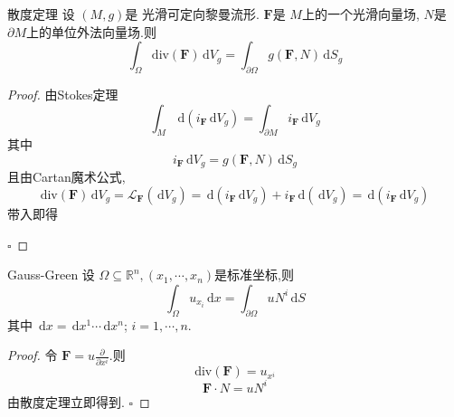 \documentclass[../../main.tex]{subfiles}
\begin{document}
\begin{theorem}{散度定理}
    设 \(  \left( M,g \right)   \)是 光滑可定向黎曼流形. \(  \mathbf{F}  \)是 \(  M  \)上的一个光滑向量场, \(  N  \)是 \(   \partial M  \)上的单位外法向量场.则 \[
    \int_{ \Omega } \mathrm{div}\left(  \mathbf{F} \right) \,\mathrm{d} V_{g}=  \int_{ \partial  \Omega }g\left( \mathbf{F},N \right)\,\mathrm{d} S_{g}  
    \]    
\end{theorem}

\begin{proof}
    由Stokes定理 \[
    \int_{M}\,\mathrm{d} \left( i _{\mathbf{F}}\,\mathrm{d} V _{g}\right)= \int_{ \partial M} i_{\mathbf{F}}\,\mathrm{d} V_{g} 
    \]其中 \[
    i_{\mathbf{F}}\,\mathrm{d} V_{g}= g\left( \mathbf{F},N \right)\,\mathrm{d} S_{g} 
    \]且由Cartan魔术公式, \[
     \mathrm{div}\left( \mathbf{F} \right)\,\mathrm{d} V_{g}= \mathcal{L}_{\mathbf{F}}\left( \,\mathrm{d} V _{g}\right) = \,\mathrm{d} \left( i_{\mathbf{F}}\,\mathrm{d} V_{g} \right)+ i_{\mathbf{F}}\,\mathrm{d} \left( \,\mathrm{d} V_{g} \right)= \,\mathrm{d} \left( i_{\mathbf{F}}\,\mathrm{d} V_{g} \right)   
    \]带入即得

    \hfill $\square$
\end{proof}
\begin{corollary}{Gauss-Green}
        设 \(   \Omega \subseteq \mathbb{R} ^{n},\left(  x_1,\cdots,x_n  \right)   \)是标准坐标,则 \[
    \int_{ \Omega }u_{x_{i}}\,\mathrm{d} x= \int_{ \partial  \Omega }u N ^{i}\,\mathrm{d} S
    \] 其中 \(  \,\mathrm{d} x= \,\mathrm{d} x^{1}\cdots \,\mathrm{d} x^{n}\); \(  i=  1,\cdots,n   \).  
\end{corollary}
\begin{proof}
 令 \(  \mathbf{F}= u\frac{\partial }{\partial x^{i}}  \).则 \[
 \mathrm{div}\left( \mathbf{F} \right) = u_{x^{i}}
 \]  \[
 \mathbf{F}\cdot N= uN^{i}
 \]由散度定理立即得到.
    \hfill $\square$
\end{proof}
\end{document}
